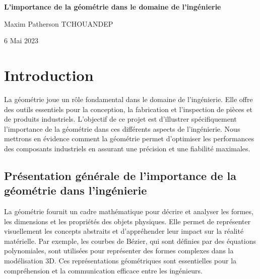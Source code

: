 \documentclass{article}
\begin{document}
\begin{titlepage}
	\thispagestyle{fancy} %
	\centering
	\vspace*{\fill}
	\huge\bfseries{L'importance de la géométrie dans le domaine de l'ingénierie}
	\vspace{3cm}

	\Large{Maxim Patherson TCHOUANDEP}

	\vspace{3cm}
	
	\Large{6 Mai 2023}
	
	\vspace*{\fill}

\end{titlepage}



\tableofcontents
\newpage






\section{Introduction}
La géométrie joue un rôle fondamental dans le domaine de l'ingénierie. Elle offre des outils essentiels pour la conception, la fabrication et l'inspection de pièces et de produits industriels. L'objectif de ce projet est d'illustrer spécifiquement l'importance de la géométrie dans ces différents aspects de l'ingénierie. Nous mettrons en évidence comment la géométrie permet d'optimiser les performances des composants industriels en assurant une précision et une fiabilité maximales.

\subsection{Présentation générale de l'importance de la géométrie dans l'ingénierie}
La géométrie fournit un cadre mathématique pour décrire et analyser les formes, les dimensions et les propriétés des objets physiques. Elle permet de représenter visuellement les concepts abstraits et d'appréhender leur impact sur la réalité matérielle. Par exemple, les courbes de Bézier, qui sont définies par des équations polynomiales, sont utilisées pour représenter des formes complexes dans la modélisation 3D. Ces représentations géométriques sont essentielles pour la compréhension et la communication efficace entre les ingénieurs.
\end{document}
